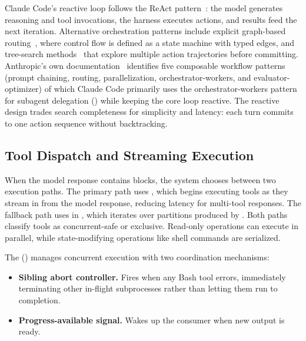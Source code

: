 Claude Code's reactive loop follows the ReAct pattern~\citep{yao2022react}: the model generates reasoning and tool invocations, the harness executes actions, and results feed the next iteration. Alternative orchestration patterns include explicit graph-based routing~\citep{langgraph2024}, where control flow is defined as a state machine with typed edges, and tree-search methods~\citep{zhou2024lats} that explore multiple action trajectories before committing. Anthropic's own documentation~\citep{anthropic2024effective} identifies five composable workflow patterns (prompt chaining, routing, parallelization, orchestrator-workers, and evaluator-optimizer) of which Claude Code primarily uses the orchestrator-workers pattern for subagent delegation () while keeping the core loop reactive. The reactive design trades search completeness for simplicity and latency: each turn commits to one action sequence without backtracking.

\subsection{Tool Dispatch and Streaming Execution}
\label{sec:turn:dispatch}

When the model response contains  blocks, the system chooses between two execution paths. The primary path uses , which begins executing tools as they stream in from the model response, reducing latency for multi-tool responses. The fallback path uses  in , which iterates over partitions produced by . Both paths classify tools as concurrent-safe or exclusive. Read-only operations can execute in parallel, while state-modifying operations like shell commands are serialized.

The  () manages concurrent execution with two coordination mechanisms:

\begin{itemize}[nosep]
  \item \textbf{Sibling abort controller.} Fires when any Bash tool errors, immediately terminating other in-flight subprocesses rather than letting them run to completion.
  \item \textbf{Progress-available signal.} Wakes up the  consumer when new output is ready.
\end{itemize}

